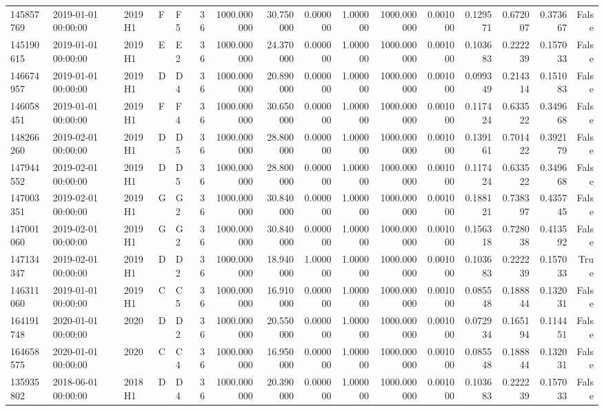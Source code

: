 \begin{tabular}{lllllrrrrrrrrrrr}
145857769 & 2019-01-01 00:00:00 & 2019H1 & F & F5 & 36 & 1000.000000 & 30.750000 & 0.000000 & 1.000000 & 1000.000000 & 0.001000 & 0.129571 & 0.672007 & 0.373667 & False \\
145190615 & 2019-01-01 00:00:00 & 2019H1 & E & E2 & 36 & 1000.000000 & 24.370000 & 0.000000 & 1.000000 & 1000.000000 & 0.001000 & 0.103683 & 0.222239 & 0.157033 & False \\
146674957 & 2019-01-01 00:00:00 & 2019H1 & D & D4 & 36 & 1000.000000 & 20.890000 & 0.000000 & 1.000000 & 1000.000000 & 0.001000 & 0.099349 & 0.214314 & 0.151083 & False \\
146058451 & 2019-01-01 00:00:00 & 2019H1 & F & F4 & 36 & 1000.000000 & 30.650000 & 0.000000 & 1.000000 & 1000.000000 & 0.001000 & 0.117424 & 0.633522 & 0.349668 & False \\
148266260 & 2019-02-01 00:00:00 & 2019H1 & D & D5 & 36 & 1000.000000 & 28.800000 & 0.000000 & 1.000000 & 1000.000000 & 0.001000 & 0.139161 & 0.701422 & 0.392179 & False \\
147944552 & 2019-02-01 00:00:00 & 2019H1 & D & D5 & 36 & 1000.000000 & 28.800000 & 0.000000 & 1.000000 & 1000.000000 & 0.001000 & 0.117424 & 0.633522 & 0.349668 & False \\
147003351 & 2019-02-01 00:00:00 & 2019H1 & G & G2 & 36 & 1000.000000 & 30.840000 & 0.000000 & 1.000000 & 1000.000000 & 0.001000 & 0.188121 & 0.738397 & 0.435745 & False \\
147001060 & 2019-02-01 00:00:00 & 2019H1 & G & G2 & 36 & 1000.000000 & 30.840000 & 0.000000 & 1.000000 & 1000.000000 & 0.001000 & 0.156318 & 0.728038 & 0.413592 & False \\
147134347 & 2019-02-01 00:00:00 & 2019H1 & D & D2 & 36 & 1000.000000 & 18.940000 & 1.000000 & 1.000000 & 1000.000000 & 0.001000 & 0.103683 & 0.222239 & 0.157033 & True \\
146311060 & 2019-01-01 00:00:00 & 2019H1 & C & C5 & 36 & 1000.000000 & 16.910000 & 0.000000 & 1.000000 & 1000.000000 & 0.001000 & 0.085548 & 0.188844 & 0.132031 & False \\
164191748 & 2020-01-01 00:00:00 & 2020 & D & D2 & 36 & 1000.000000 & 20.550000 & 0.000000 & 1.000000 & 1000.000000 & 0.001000 & 0.072934 & 0.165194 & 0.114451 & False \\
164658575 & 2020-01-01 00:00:00 & 2020 & C & C4 & 36 & 1000.000000 & 16.950000 & 0.000000 & 1.000000 & 1000.000000 & 0.001000 & 0.085548 & 0.188844 & 0.132031 & False \\
135935802 & 2018-06-01 00:00:00 & 2018H1 & D & D4 & 36 & 1000.000000 & 20.390000 & 0.000000 & 1.000000 & 1000.000000 & 0.001000 & 0.103683 & 0.222239 & 0.157033 & False \\

\end{tabular}
